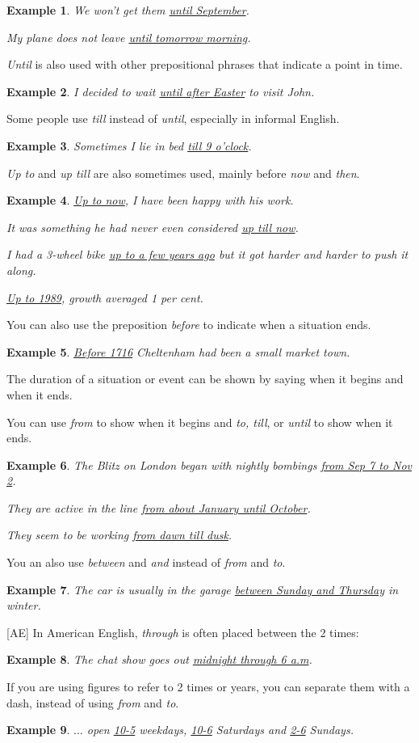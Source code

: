 \documentclass[oneside]{book}
\numberwithin{equation}{section}
\newtheorem{example}{Example}[section]
\begin{document}
\begin{example}
    We won't get them \underline{until September}.
    
    My plane does not leave \underline{until tomorrow morning}.
\end{example}
\textit{Until} is also used with other prepositional phrases that indicate a point in time.
\begin{example}
    I decided to wait \underline{until after Easter} to visit John.
\end{example}
Some people use \textit{till} instead of \textit{until}, especially in informal English.
\begin{example}
    Sometimes I lie in bed \underline{till 9 o'clock}.
\end{example}
\textit{Up to} and \textit{up till} are also sometimes used, mainly before \textit{now} and \textit{then}.
\begin{example}
    \underline{Up to now}, I have been happy with his work.
    
    It was something he had never even considered \underline{up till now}.
    
    I had a 3-wheel bike \underline{up to a few years ago} but it got harder and harder to push it along.
    
    \underline{Up to 1989}, growth averaged 1 per cent.
\end{example}
%
\noindent{} You can also use the preposition \textit{before} to indicate when a situation ends.
\begin{example}
    \underline{Before 1716} Cheltenham had been a small market town.
\end{example}
%
\noindent{} The duration of a situation or event can be shown by saying when it begins and when it ends.

You can use \textit{from} to show when it begins and \textit{to, till}, or \textit{until} to show when it ends.
\begin{example}
    The Blitz on London began with nightly bombings \underline{from Sep 7 to Nov 2}.
    
    They are active in the line \underline{from about January until October}.
    
    They seem to be working \underline{from dawn till dusk}.
\end{example}
You an also use \textit{between} and \textit{and} instead of \textit{from} and \textit{to}.
\begin{example}
    The car is usually in the garage \underline{between Sunday and Thursday} in winter.
\end{example}
[AE] In American English, \textit{through} is often placed between the 2 times:
\begin{example}
    The chat show goes out \underline{midnight through 6 a.m}.
\end{example}
If you are using figures to refer to 2 times or years, you can separate them with a dash, instead of using \textit{from} and \textit{to}.
\begin{example}
    $\ldots$ open \underline{10-5} weekdays, \underline{10-6} Saturdays and \underline{2-6} Sundays.
\end{example}
\end{document}
